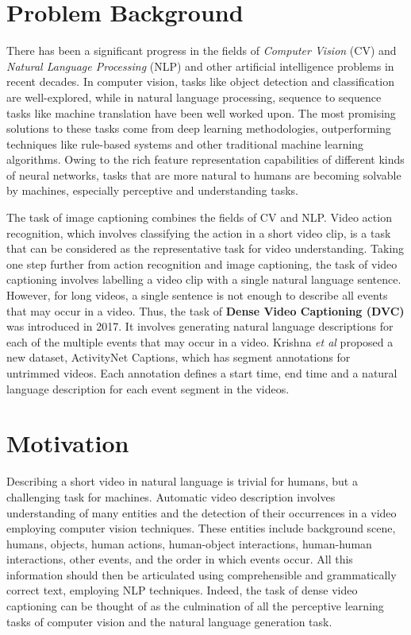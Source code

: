 \section{Problem Background}

\par There has been a significant progress in the fields of \textit{Computer Vision} (CV) and \textit{Natural Language Processing} (NLP) and other artificial intelligence problems in recent decades. In computer vision, tasks like object detection and classification are well-explored, while in natural language processing, sequence to sequence tasks like machine translation have been well worked upon. The most promising solutions to these tasks come from deep learning methodologies, outperforming techniques like rule-based systems and other traditional machine learning algorithms. Owing to the rich feature representation capabilities of different kinds of neural networks, tasks that are more natural to humans are becoming solvable by machines, especially perceptive and understanding tasks.

\par The task of image captioning combines the fields of CV and NLP. Video action recognition, which involves classifying the action in a short video clip, is a task that can be considered as the representative task for video understanding. Taking one step further from action recognition and image captioning, the task of video captioning involves labelling a video clip with a single natural language sentence. However, for long videos, a single sentence is not enough to describe all events that may occur in a video. Thus, the task of \textbf{Dense Video Captioning (DVC)} was introduced \cite{krishna2017densecaptioning} in 2017. It involves generating natural language descriptions for each of the multiple events that may occur in a video. Krishna \textit{et al} proposed a new dataset, ActivityNet Captions, which has segment annotations for untrimmed videos. Each annotation defines a start time, end time and a natural language description for each event segment in the videos.

\section{Motivation}
\par Describing a short video in natural language is trivial for humans, but a challenging task for machines. Automatic video description involves understanding of many entities and the detection of their occurrences in a video employing computer vision techniques. These entities include background scene, humans, objects, human actions, human-object interactions, human-human interactions, other events, and the order in which events occur. All this information should then be articulated using comprehensible and grammatically correct text, employing NLP techniques\cite{aafaq2020video}. Indeed, the task of dense video captioning can be thought of as the culmination of all the perceptive learning tasks of computer vision and the natural language generation task.

